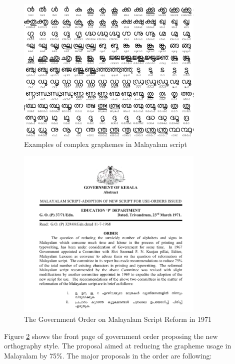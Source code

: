 \documentclass[10pt]{article}
\begin{document}
\begin{figure}[h!]
	\centering
	\includegraphics[width=0.8\textwidth]{images/complexgraphemes.png}
	\caption{Examples of complex graphemes in Malayalam script}
	\label{complexgrapheme}
\end{figure}


\begin{figure}[h!]
	\centering
	\includegraphics[width=0.8\textwidth]{images/1971-gov-script-reformation-order.png}
	\caption{The Government Order on Malayalam Script Reform in 1971}
	\label{go1971}
\end{figure}

Figure \ref{go1971} shows the front page of government order proposing the new orthography style. The proposal aimed at reducing the grapheme usage in Malayalam by 75\%. The major proposals in the order are following: \cite{1971go}
\end{document}
